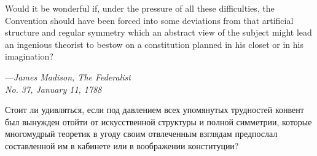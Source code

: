 \null
\vskip 1in

\begingroup
\raggedright
\list{}{\rightmargin=8pc \leftmargin=8pc}\item[] \small
Would it be wonderful if, under the pressure of all these difficulties,
the Convention should have been forced into some deviations from that
artificial structure and regular symmetry which an abstract view of the
subject might lead an ingenious theorist to bestow on a constitution
planned in his closet or in his imagination?
\par\vskip 4pt
\begin{tabbing}
---\=\emph{James Madison, The Federalist} \\
\>\emph{No. 37, January 11, 1788}
\end{tabbing}
\endlist
\endgroup

\newpage 

\null
\vskip 1in

\begingroup
\raggedright
\list{}{\rightmargin=8pc \leftmargin=8pc}\item[] \small
Стоит ли удивляться, если под давлением всех упомянутых трудностей конвент был
вынужден отойти от искусственной структуры и полной симметрии, которые
многомудрый теоретик в угоду своим отвлеченным взглядам предпослал составленной
им в кабинете или в воображении конституции?

\par\vskip 4pt
\endlist
\endgroup

